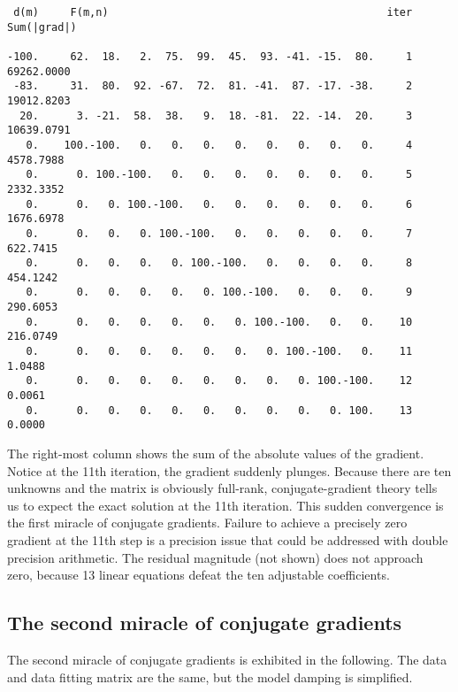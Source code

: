 {\samepage
\par\noindent
\footnotesize
\begin{verbatim}
 d(m)     F(m,n)                                            iter   Sum(|grad|)

-100.     62.  18.   2.  75.  99.  45.  93. -41. -15.  80.     1    69262.0000
 -83.     31.  80.  92. -67.  72.  81. -41.  87. -17. -38.     2    19012.8203
  20.      3. -21.  58.  38.   9.  18. -81.  22. -14.  20.     3    10639.0791
   0.    100.-100.   0.   0.   0.   0.   0.   0.   0.   0.     4     4578.7988
   0.      0. 100.-100.   0.   0.   0.   0.   0.   0.   0.     5     2332.3352
   0.      0.   0. 100.-100.   0.   0.   0.   0.   0.   0.     6     1676.6978
   0.      0.   0.   0. 100.-100.   0.   0.   0.   0.   0.     7      622.7415
   0.      0.   0.   0.   0. 100.-100.   0.   0.   0.   0.     8      454.1242
   0.      0.   0.   0.   0.   0. 100.-100.   0.   0.   0.     9      290.6053
   0.      0.   0.   0.   0.   0.   0. 100.-100.   0.   0.    10      216.0749
   0.      0.   0.   0.   0.   0.   0.   0. 100.-100.   0.    11        1.0488
   0.      0.   0.   0.   0.   0.   0.   0.   0. 100.-100.    12        0.0061
   0.      0.   0.   0.   0.   0.   0.   0.   0.   0. 100.    13        0.0000
\end{verbatim}
}
\normalsize

\par
The right-most column shows the sum of the absolute values of the gradient.
Notice at the 11th iteration,
the gradient suddenly plunges.
Because there are ten unknowns and the matrix is obviously full-rank,
conjugate-gradient theory tells us to expect
the exact solution at the 11th iteration.
This sudden convergence is the first miracle of conjugate gradients.
Failure to achieve a precisely zero gradient at the 11th step
is a precision issue that could be addressed
with double precision arithmetic.
The residual magnitude (not shown) does not approach zero,
because 13 linear equations defeat the ten adjustable coefficients.


\subsection{The second miracle of conjugate gradients}

The second miracle of conjugate gradients is exhibited in the following.
The data and data fitting matrix are the same,
but the model damping is simplified.

